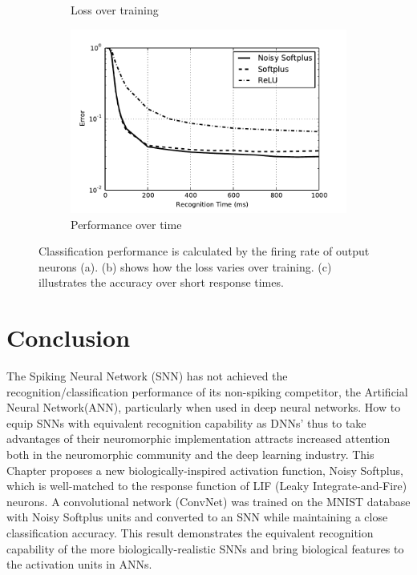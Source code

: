 \begin{figure}[bt!]
\begin{subfigure}[t]{0.4\textwidth}
		    \caption{Loss over training}
		    \label{Fig:loss}
		\end{subfigure}
		\begin{subfigure}[t]{0.4\textwidth}
			\includegraphics[width=\textwidth]{pics_iconip/9.pdf}
		    \caption{Performance over time}
		    \label{Fig:response}
		\end{subfigure}

		\caption{
			Classification performance is calculated by the firing rate of output neurons (a).
			(b) shows how the loss varies over training.
			(c) illustrates the accuracy over short response times.}
		\label{fig:training}	
	\end{figure}
\section{Conclusion}
	The Spiking Neural Network (SNN) has not achieved the recognition/classification performance of its non-spiking competitor, the Artificial Neural Network(ANN), particularly when used in deep neural networks.
	How to equip SNNs with equivalent recognition capability as DNNs' thus to take advantages of their neuromorphic implementation attracts increased attention both in the neuromorphic community and the deep learning industry.
	This Chapter proposes a new biologically-inspired activation function, Noisy Softplus, which is well-matched to the response function of LIF (Leaky Integrate-and-Fire) neurons.
	A convolutional network (ConvNet) was trained on the MNIST database with Noisy Softplus units and converted to an SNN while maintaining a close classification accuracy.
	This result demonstrates the equivalent recognition capability of the more biologically-realistic SNNs and bring biological features to the activation units in ANNs.
	

